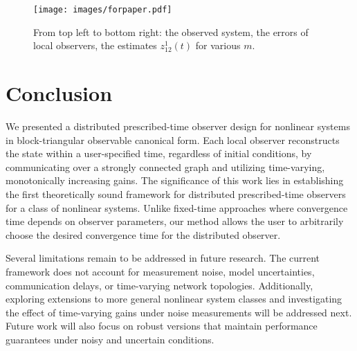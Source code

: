 \documentclass[journal]{IEEEtran}
\begin{document}
\begin{figure}[t!]
    \centering
    \texttt{[image: images/forpaper.pdf]}
    \caption{From top left to bottom right: the observed system, the errors of local observers, the estimates $z^{1}_{12}(t)$ for various $m$. 
    }
    \label{fig:allfigs}
\end{figure}

\section{Conclusion}

We presented a distributed prescribed-time observer design for nonlinear systems in block-triangular observable canonical form. 
Each local observer reconstructs the state within a user-specified time, regardless of initial conditions, by communicating over a strongly connected graph and utilizing time-varying, monotonically increasing gains.
The significance of this work lies in establishing the first theoretically sound framework for distributed prescribed-time observers for a class of nonlinear systems. Unlike fixed-time approaches where convergence time depends on observer parameters, our method allows the user to arbitrarily choose the desired convergence time for the distributed observer.


Several limitations remain to be addressed in future research. The current framework does not account for measurement noise, model uncertainties, communication delays, or time-varying network topologies. Additionally, exploring extensions to more general nonlinear system classes and investigating the effect of time-varying gains under noise measurements will be addressed next. Future work will also focus on robust versions that maintain performance guarantees under noisy and uncertain conditions.
\end{document}
